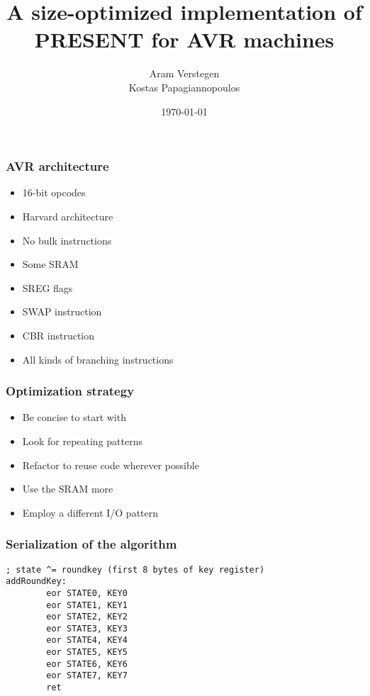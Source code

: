 \documentclass{beamer}
\begin{document}
\title{A size-optimized implementation of PRESENT for AVR machines}
\author{
Aram Verstegen \\
Kostas Papagiannopoulos
}
\date{\today}

\frame{\titlepage}

\begin{frame}
\frametitle{AVR architecture}
        \begin{itemize}
        \item 16-bit opcodes
        \item Harvard architecture
        \item No bulk instructions
        \item Some SRAM
        \item SREG flags
        \item SWAP instruction
        \item CBR instruction
        \item All kinds of branching instructions
        \end{itemize}
\end{frame}

\begin{frame}
\frametitle{Optimization strategy}
        \begin{itemize}
        \item Be concise to start with
        \item Look for repeating patterns
        \item Refactor to reuse code wherever possible
        \item Use the SRAM more
        \item Employ a different I/O pattern
        \end{itemize}
\end{frame}

\begin{frame}[fragile]
\frametitle{Serialization of the algorithm}
\begin{lstlisting}
; state ^= roundkey (first 8 bytes of key register)
addRoundKey:
        eor STATE0, KEY0
        eor STATE1, KEY1
        eor STATE2, KEY2
        eor STATE3, KEY3
        eor STATE4, KEY4
        eor STATE5, KEY5
        eor STATE6, KEY6
        eor STATE7, KEY7
        ret
\end{lstlisting}
\end{frame}
\end{document}
